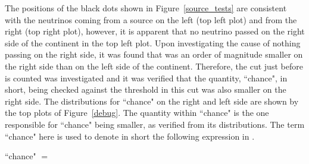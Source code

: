 The positions of the black dots shown in Figure~\ref{source_tests} are consistent with the neutrinos coming from a source on the left (top left plot) and from the right (top right plot), however, it is apparent that no neutrino passed on the right side of the continent in the top left plot. Upon investigating the cause of nothing passing on the right side, it was found that  was an order of magnitude smaller on the right side than on the left side of the continent. Therefore, the cut just before  is counted was investigated and it was verified that the quantity, ``chance", in short, being checked against the threshold in this cut was also smaller on the right side. The distributions for ``chance" on the right and left side are shown by the top plots of Figure~\ref{debug}. The quantity  within ``chance" is the one responsible for ``chance" being smaller, as verified from its distributions. 
The term ``chance" here is used to denote in short the following expression in . 

\begin{center}
``chance" $=$ 
\end{center}

